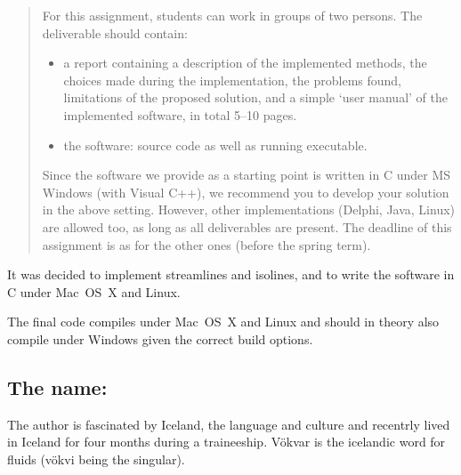 \begin{quote}
\begin{itemize}
\end{itemize}

For this assignment, students can work in groups of two persons. The
deliverable should contain: 

\begin{itemize}
  
  \item a report containing a description of the implemented methods, the
  choices made during the implementation, the problems found, limitations of
  the proposed solution, and a simple `user manual' of the implemented
  software, in total 5--10 pages. 

  \item the software: source code as well as running executable. 

\end{itemize}

Since the software we provide as a starting point is written in C under MS
Windows (with Visual C++), we recommend you to develop your solution in the
above setting. However, other implementations (Delphi, Java, Linux) are allowed
too, as long as all deliverables are present. The deadline of this assignment
is as for the other ones (before the spring term).

\end{quote}

It was decided to implement streamlines and isolines, and to write the software
in C under Mac~OS~X and Linux. 

The final code compiles under Mac~OS~X and Linux and should in theory also
compile under Windows given the correct build options.

\subsection{The name: \fluids{}}

The author is fascinated by Iceland, the language and culture and recentrly
lived in Iceland for four months during a traineeship. V\"okvar is the
icelandic word for fluids (v\"okvi being the singular).

